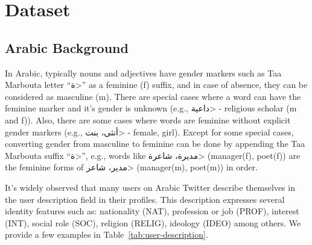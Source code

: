 \documentclass[sigconf,authorversion,nonacm]{acmart}
\begin{document}
\section{Dataset}
\label{sec:dataset}

\subsection{Arabic Background}
\label{ssec:arabic_back}
In Arabic, typically nouns and adjectives have gender markers such as Taa Marbouta letter ``\<ة>'' as a feminine (f) suffix, and in case of absence, they can be considered as masculine (m). 
There are special cases where a word can have the feminine marker and it's gender is unknown (e.g., \<داعية> - religious scholar (m and f)). Also, there are some cases where words are feminine without explicit gender markers (e.g., \<أنثى، بنت> - female, girl). Except for some special cases, converting gender from masculine to feminine can be done by appending the Taa Marbouta suffix ``\<ة>'', e.g., words like \<مديرة، شاعرة> (manager(f), poet(f)) are the feminine forms of \<مدير، شاعر> (manager(m), poet(m)) in order.

It's widely observed that many users on Arabic Twitter describe themselves in the user description field in their profiles. This description expresses several identity features such as: nationality (NAT), profession or job (PROF), interest (INT), social role (SOC), religion (RELIG), ideology (IDEO) among others. We provide a few examples in Table~\ref{tab:user-description}.
\end{document}
